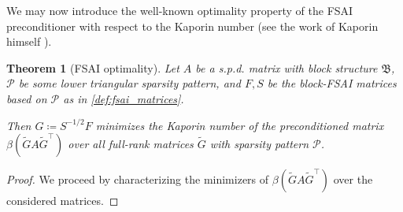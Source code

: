 \documentclass[a4paper]{article}
\theoremstyle{plain}
\newtheorem{theorem}{Theorem}[section]
\theoremstyle{definition}
\theoremstyle{remark}
\begin{document}
We may now introduce the well-known optimality property of the FSAI preconditioner with respect to the Kaporin number (see the work of Kaporin himself \cite{Kaporin1994}).
\begin{theorem}[FSAI optimality]\label{thm:fsai_kaporin}
	Let \(A\) be a s.p.d. matrix with block structure \(\mathfrak{B}\), \(\mathcal{P}\) be some lower triangular sparsity pattern, and \(F, S\) be the block-FSAI matrices based on \(\mathcal{P}\) as in \cref{def:fsai_matrices}.
	
	Then \(G \coloneqq S^{-1/2} F\) minimizes the Kaporin number of the preconditioned matrix \(\beta(\tilde{G} A \tilde{G}^{\top})\) over all full-rank matrices \(\tilde{G}\) with sparsity pattern \(\mathcal{P}\).
\end{theorem}
\begin{proof}
	We proceed by characterizing the minimizers of \(\beta(\tilde{G} A \tilde{G}^{\top})\) over the considered matrices.
	

\end{proof}
\end{document}
